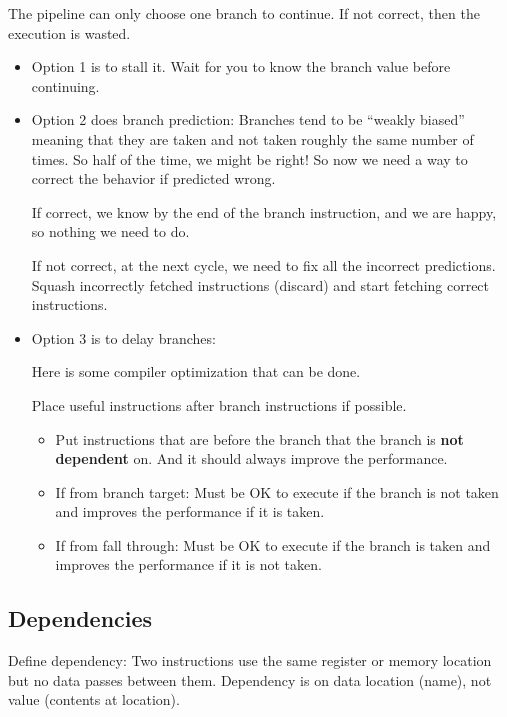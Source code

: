 \documentclass[letterpaper,12pt]{article}
\begin{document}
The pipeline can only choose one branch to continue. If not correct, then the execution is wasted.

\begin{itemize}
    \item Option 1 is to stall it. Wait for you to know the branch value before continuing.
    \item Option 2 does branch prediction:
          Branches tend to be ``weakly biased'' meaning that they are taken and not taken roughly the same number of times. So half of the time, we might be right! So now we need a way to correct the behavior if predicted wrong.

          If correct, we know by the end of the branch instruction, and we are happy, so nothing we need to do.

          If not correct, at the next cycle, we need to fix all the incorrect predictions. Squash incorrectly fetched instructions (discard) and start fetching correct instructions.

    \item Option 3 is to delay branches:

          Here is some compiler optimization that can be done.

          Place useful instructions after branch instructions if possible.

          \begin{itemize}
              \item Put instructions that are before the branch that the branch is \textbf{not dependent} on. And it should always improve the performance.
              \item If from branch target: Must be OK to execute if the branch is not taken and improves the performance if it is taken.
              \item If from fall through: Must be OK to execute if the branch is taken and improves the performance if it is not taken.
          \end{itemize}
\end{itemize}


\subsection{Dependencies}
Define dependency: Two instructions use the same register or memory location but no data passes between them. Dependency is on data location (name), not value (contents at location).
\end{document}
